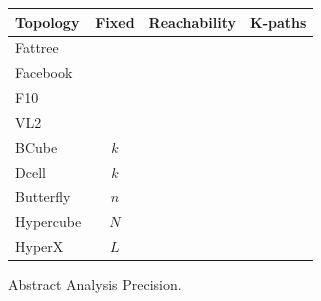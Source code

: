 \documentclass[numbers, 10pt, preprint]{sigplanconf}
\newcommand{\cmark}{\ding{51}}
\newcommand{\xmark}{\ding{55}}
\begin{document}
\begin{figure}[t!]
  \begin{center}
      \begin{tabular}{| l | c | c | c |}
      \hline
      \textbf{Topology} & \textbf{Fixed} & \textbf{Reachability} & \textbf{K-paths} \\ \hline
      Fattree~\cite{fattree} & & \cmark & \cmark  \\ \hline
      Facebook~\cite{facebook-fattree} & & \cmark & \cmark \\ \hline
      F10~\cite{f10-fattree} & & \cmark & \cmark \\ \hline
      VL2~\cite{vl2-fattree} & & & \\ \hline
      BCube~\cite{bcube} & $k$ & \cmark & \xmark \\ \hline
      Dcell~\cite{dcell} & $k$ & \cmark & \xmark \\ \hline
      Butterfly~\cite{butterfly} & $n$ & \cmark & \cmark \\ \hline
      Hypercube & $N$ & \cmark & \cmark \\ \hline
      HyperX~\cite{hyperx} & $L$ & \cmark & \cmark \\ \hline
      \end{tabular}
  \end{center}
  \caption{Abstract Analysis Precision.}
  \label{fig:analysis-precision}
\end{figure}

\end{document}

